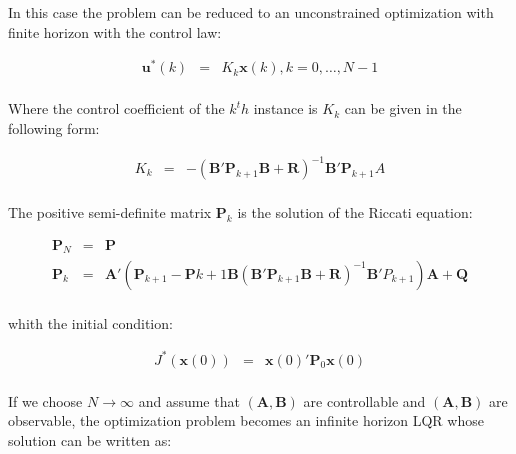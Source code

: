 		In this case the problem can be reduced to an unconstrained optimization with finite horizon with the control law: 
		
		\begin{equation}
        \begin{array}{rcl}
         \textbf{u}^*(k)&=&K_k\textbf{x}(k), k=0,\dots,N-1\\
        \end{array}
        \label{BASICMPC:equ:control_law}
    \end{equation}
		
		Where the control coefficient of the $k^th$ instance is $K_k$ can be given in the following form:
		
		\begin{equation}
        \begin{array}{rcl}
         K_k&=&-(\textbf{B}'\textbf{P}_{k+1}\textbf{B}+\textbf{R})^{-1}\textbf{B}'\textbf{P}_{k+1}A\\
        \end{array}
        \label{BASICMPC:equ:control_coefficient}
    \end{equation}
		
		The positive semi-definite matrix $\textbf{P}_k$ is the solution of the Riccati equation:
		
		\begin{equation}
        \begin{array}{rcl}
        \textbf{P}_N&=&\textbf{P}\\
				\textbf{P}_k&=&\textbf{A}'(\textbf{P}_{k+1}-\textbf{P}{k+1}\textbf{B}(\textbf{B}'\textbf{P}_{k+1}\textbf{B}+\textbf{R})^{-1}\textbf{B}'P_{k+1})\textbf{A}+\textbf{Q}\\
        \end{array}
        \label{BASICMPC:equ:Riccati}
    \end{equation}
		
		whith the initial condition:
		
		\begin{equation}
        \begin{array}{rcl}
				J^*(\textbf{x}(0))&=&\textbf{x}(0)'\textbf{P}_0\textbf{x}(0)\\
        \end{array}
        \label{BASICMPC:equ:Riccati_initial}
    \end{equation}
		
		If we choose $N\longrightarrow\infty$ and assume that $(\textbf{A},\textbf{B})$ are controllable and $(\textbf{A},\textbf{B})$ are observable, the optimization problem becomes an infinite horizon LQR whose solution can be written as:
		
